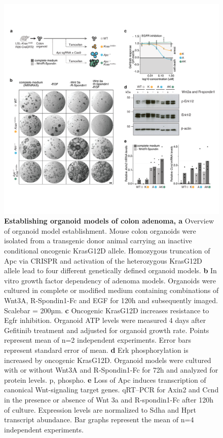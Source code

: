 \begin{flushleft}
\begin{figure}[H]
\centering
\includegraphics[width=\textwidth,
                height=\textheight,
                keepaspectratio]{figures/adenomaprofiling/pdf/fig_1_0.pdf}
\caption{\textbf{Establishing organoid models of colon adenoma, a} Overview of organoid model establishment. Mouse colon organoids were isolated from a transgenic donor animal carrying an inactive conditional oncogenic KrasG12D allele. Homozygous truncation of Apc via CRISPR and activation of the heterozygous KrasG12D allele lead to four different genetically defined organoid models.
\textbf{b} In vitro growth factor dependency of adenoma models. Organoids were cultured in complete or modified medium containing combinations of Wnt3A, R-Spondin1-Fc and EGF for 120h and subsequently imaged. Scalebar = 200µm.
\textbf{c}	Oncogenic KrasG12D increases resistance to Egfr inhibition. Organoid ATP levels were measured 4 days after Gefitinib treatment and adjusted for organoid growth rate. Points represent mean of n=2 independent experiments. Error bars represent standard error of mean.  
\textbf{d} Erk phosphorylation is increased by oncogenic KrasG12D. Organoid models were cultured with or without Wnt3A and R-Spondin1-Fc for 72h and analyzed for protein levels. p, phospho.   
\textbf{e}	Loss of Apc induces transcription of canonical Wnt-signaling target genes. qRT–PCR for Axin2 and Ccnd in the presence or absence of Wnt 3a and R-spondin1-Fc after 120h of culture. Expression levels are normalized to Sdha and Hprt transcript abundance. Bar graphs represent the mean of n=4 independent experiments.
}
\label{fig_a10}
\end{figure}
\bigbreak


\end{flushleft}
